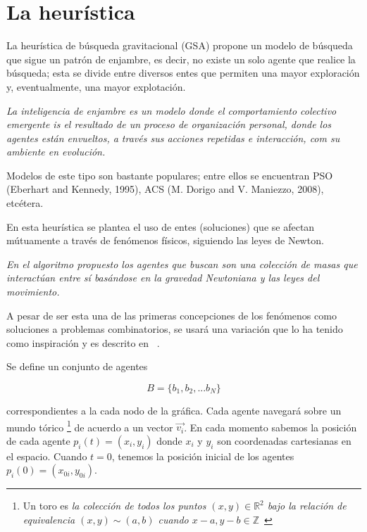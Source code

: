 \documentclass[a4paper]{report}
\begin{document}
\section{La heur\'istica}
La heur\'istica de b\'usqueda gravitacional (GSA) propone un modelo de b\'usqueda que
sigue un patr\'on de enjambre, es decir, no existe un solo agente que realice la
b\'usqueda; esta se divide entre diversos entes que permiten una mayor exploraci\'on
y, eventualmente, una mayor explotaci\'on.

\begin{center}
  \textit{La inteligencia de enjambre es un modelo donde el comportamiento colectivo
    emergente is el resultado de un proceso de organizaci\'on personal, donde los
    agentes est\'an envueltos, a trav\'es sus acciones repetidas e interacci\'on,
    com su ambiente en evoluci\'on. ~\cite{israel}}
\end{center}

Modelos de este tipo son bastante populares; entre ellos se encuentran PSO (Eberhart
and Kennedy, 1995), ACS (M. Dorigo and V. Maniezzo, 2008), etc\'etera.

En esta heur\'istica se plantea el uso de entes (soluciones) que
se afectan m\'utuamente a trav\'es de fen\'omenos f\'isicos, siguiendo las leyes
de Newton.

\begin{center}
  \textit{En el algoritmo propuesto los agentes que buscan son una colecci\'on de masas
    que interact\'uan entre s\'i bas\'andose en la gravedad Newtoniana y las leyes
    del movimiento. ~\cite{gsa}}
\end{center}

A pesar de ser esta una de las primeras concepciones de los fen\'omenos como soluciones
a problemas combinatorios, se usar\'a una variaci\'on que lo ha tenido como
inspiraci\'on y es descrito en ~\cite{israel}.

Se define un conjunto de agentes

\[B = \{b_1, b_2, ... b_N\}\]

correspondientes a la cada nodo de la gr\'afica. Cada agente navegar\'a sobre un
mundo t\'orico \footnote{Un toro es \textit{la colecci\'on de todos los puntos
    $(x, y) \in \mathbb{R}^2$ bajo la relaci\'on de equivalencia $(x, y) \sim
    (a, b)$ cuando $x - a, y-b \in \mathbb{Z}$}~\cite{toroidal}} de acuerdo
a un vector $\vec{v_i}$. En cada momento sabemos la posici\'on de cada agente
$p_i(t) = (x_i, y_i)$ donde $x_i$ y $y_i$ son coordenadas cartesianas en el
espacio. Cuando $t = 0$, tenemos la posici\'on inicial de los agentes $p_i(0) = (x_{0i}, y_{0i})$.
\end{document}
